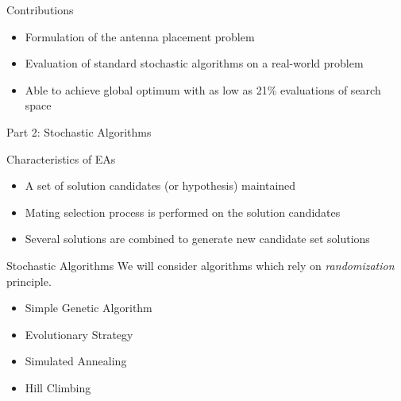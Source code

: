 \documentclass{beamer}
\begin{document}
    \begin{frame}[t]{Contributions}
        \begin{itemize}
            \item Formulation of the antenna placement problem
            \item Evaluation of standard stochastic algorithms on a real-world problem
            \item Able to achieve global optimum with as low as 21\% evaluations of search space
        \end{itemize}
        \vspace{5mm}
    \end{frame}


        \begin{frame}{\null}
        \begin{tcolorbox}[colback=green!5]
            \centering\Huge
            Part 2: Stochastic Algorithms
        \end{tcolorbox}
    \end{frame}
    \begin{frame}[t]{Characteristics of EAs}
    \begin{itemize} \itemsep1.5em
            \item A set of solution candidates (or hypothesis) maintained
            \item Mating selection process is performed on the solution candidates
            \item Several solutions are combined to generate new candidate set solutions
        \end{itemize}
    \end{frame}

    \begin{frame}[t]{Stochastic Algorithms}
        We will consider algorithms which rely on \textit{randomization} principle.
        \vspace{10px}
    \begin{itemize} \itemsep1.5em
            \item Simple Genetic Algorithm
            \item Evolutionary Strategy
            \item Simulated Annealing
            \item Hill Climbing
        \end{itemize}
    \end{frame}
\end{document}
